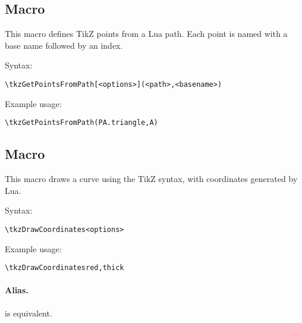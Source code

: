 
\subsection{Macro } %
\label{sub:macro_tkzGetPointsFromPath}

This macro defines TikZ points from a Lua path. Each point is named with a base name followed by an index.

\medskip
\noindent
Syntax:

\begin{verbatim}
\tkzGetPointsFromPath[<options>](<path>,<basename>)
\end{verbatim}

\noindent
Example usage:

\begin{mybox}
\begin{verbatim}
\tkzGetPointsFromPath(PA.triangle,A)
\end{verbatim}
\end{mybox}


\subsection{Macro } %
\label{sub:macro_tkzDrawCoordinates}

This macro draws a curve using the TikZ  syntax, with coordinates generated by Lua.

\medskip
\noindent
Syntax:

\begin{verbatim}
\tkzDrawCoordinates<options>
\end{verbatim}

\noindent
Example usage:

\begin{mybox}
\begin{verbatim}
\tkzDrawCoordinatesred,thick
\end{verbatim}
\end{mybox}

\paragraph{Alias.}  is equivalent.

